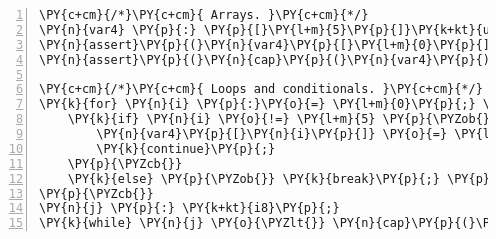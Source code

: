 \begin{Verbatim}[commandchars=\\\{\},numbers=left,firstnumber=1,stepnumber=1]
\PY{c+cm}{/*}\PY{c+cm}{ Arrays. }\PY{c+cm}{*/}
\PY{n}{var4} \PY{p}{:} \PY{p}{[}\PY{l+m}{5}\PY{p}{]}\PY{k+kt}{u64}\PY{p}{;} \PY{c+c1}{// Unsigned 64\PYZhy{}bit int array of size 5.}
\PY{n}{assert}\PY{p}{(}\PY{n}{var4}\PY{p}{[}\PY{l+m}{0}\PY{p}{]} \PY{o}{==} \PY{n}{var1} \PY{o}{==} \PY{l+m}{0}\PY{p}{)}\PY{p}{;} \PY{c+c1}{// 0\PYZhy{}based indexing. Uninit. vars. are equal to 0.}
\PY{n}{assert}\PY{p}{(}\PY{n}{cap}\PY{p}{(}\PY{n}{var4}\PY{p}{)} \PY{o}{==} \PY{n}{len}\PY{p}{(}\PY{n}{var4}\PY{p}{)} \PY{o}{==} \PY{l+m}{5}\PY{p}{)}\PY{p}{;} \PY{c+c1}{// cap(.) and len(.) get size of array.}

\PY{c+cm}{/*}\PY{c+cm}{ Loops and conditionals. }\PY{c+cm}{*/}
\PY{k}{for} \PY{n}{i} \PY{p}{:}\PY{o}{=} \PY{l+m}{0}\PY{p}{;} \PY{n}{i} \PY{o}{\PYZlt{}} \PY{n}{cap}\PY{p}{(}\PY{n}{var4}\PY{p}{)}\PY{p}{;} \PY{n}{i}\PY{o}{++} \PY{p}{\PYZob{}}
    \PY{k}{if} \PY{n}{i} \PY{o}{!=} \PY{l+m}{5} \PY{p}{\PYZob{}} \PY{c+c1}{// Parentheses are optional for conditionals.}
        \PY{n}{var4}\PY{p}{[}\PY{n}{i}\PY{p}{]} \PY{o}{=} \PY{l+m}{2} \PY{o}{\PYZlt{}\PYZlt{}} \PY{l+m}{1}\PY{p}{;}
        \PY{k}{continue}\PY{p}{;}
    \PY{p}{\PYZcb{}}
    \PY{k}{else} \PY{p}{\PYZob{}} \PY{k}{break}\PY{p}{;} \PY{p}{\PYZcb{}}
\PY{p}{\PYZcb{}}
\PY{n}{j} \PY{p}{:} \PY{k+kt}{i8}\PY{p}{;}
\PY{k}{while} \PY{n}{j} \PY{o}{\PYZlt{}} \PY{n}{cap}\PY{p}{(}\PY{n}{var4}\PY{p}{)} \PY{p}{\PYZob{}} \PY{n}{printf}\PY{p}{(}\PY{l+s}{\PYZdq{}\PYZpc{}d \PYZdq{}}\PY{p}{,} \PY{n}{var4}\PY{p}{[}\PY{n}{j}\PY{o}{++}\PY{p}{]}\PY{p}{)}\PY{p}{;} \PY{p}{\PYZcb{}} \PY{c+c1}{// C\PYZhy{}styled printf.}
\end{Verbatim}

